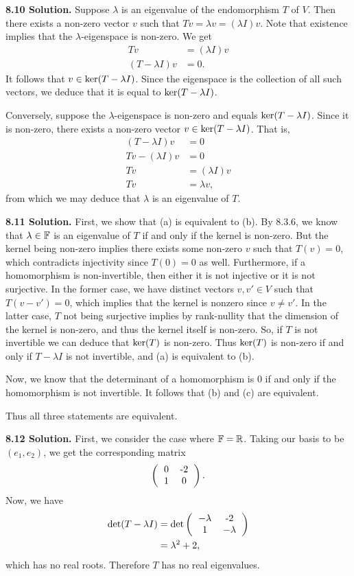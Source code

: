 \textbf{8.10 Solution.} Suppose $\lambda$ is an eigenvalue of the endomorphism $T$ of $V$. Then there exists a non-zero vector $v$ such that $Tv = \lambda v = (\lambda I)v$. Note that existence implies that the $\lambda$-eigenspace is non-zero. We get
\begin{align*}
    Tv &= (\lambda I)v \\
    (T - \lambda I)v &= 0.
\end{align*}
It follows that $v \in \text{ker}(T - \lambda I)$. Since the eigenspace is the collection of all such vectors, we deduce that it is equal to $\text{ker}(T - \lambda I)$.

Conversely, suppose the $\lambda$-eigenspace is non-zero and equals $\text{ker}(T - \lambda I)$. Since it is non-zero, there exists a non-zero vector $v \in \text{ker}(T - \lambda I)$. That is,
\begin{align*}
    (T - \lambda I)v &= 0 \\
    Tv - (\lambda I)v &= 0 \\
    Tv &= (\lambda I)v \\
    Tv &= \lambda v,
\end{align*}
from which we may deduce that $\lambda$ is an eigenvalue of $T$.

\textbf{8.11 Solution.} First, we show that (a) is equivalent to (b). By 8.3.6, we know that $\lambda \in \mathbb{F}$ is an eigenvalue of $T$ if and only if the kernel is non-zero. But the kernel being non-zero implies there exists some non-zero $v$ such that $T(v) = 0$, which contradicts injectivity since $T(0) = 0$ as well. Furthermore, if a homomorphism is non-invertible, then either it is not injective or it is not surjective. In the former case, we have distinct vectors $v, v' \in V$ such that $T(v - v') = 0$, which implies that the kernel is nonzero since $v \neq v'$. In the latter case, $T$ not being surjective implies by rank-nullity that the dimension of the kernel is non-zero, and thus the kernel itself is non-zero. So, if $T$ is not invertible we can deduce that $\text{ker}(T)$ is non-zero. Thus $\text{ker}(T)$ is non-zero if and only if $T - \lambda I$ is not invertible, and (a) is equivalent to (b).

Now, we know that the determinant of a homomorphism is 0 if and only if the homomorphism is not invertible. It follows that (b) and (c) are equivalent. 

Thus all three statements are equivalent.

\textbf{8.12 Solution.} First, we consider the case where $\mathbb{F} = \mathbb{R}$. Taking our basis to be $(e_1, e_2)$, we get the corresponding matrix
\[\left(
\begin{tabular}{cc}
    0 & -2 \\
    1 & 0
\end{tabular}
\right).\]
Now, we have
\begin{align*}
    \f{det}(T - \lambda I) &= \f{det}\left(\begin{tabular}{cc} $-\lambda$ & -2 \\ 1 & $-\lambda$ \end{tabular}\right) \\
        &= \lambda^2 + 2,
\end{align*}
which has no real roots. Therefore $T$ has no real eigenvalues.

